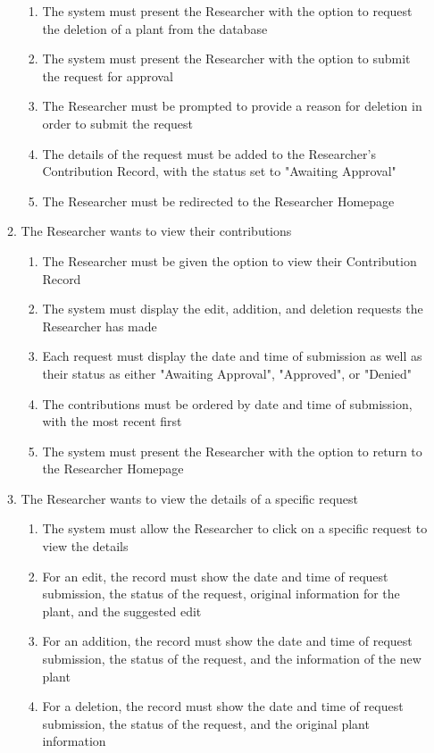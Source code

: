\documentclass[]{article}
\begin{document}
\begin{enumerate}[{VP}1.]
\begin{enumerate}[{BE2}.1]
		\begin{enumerate}
			\item The system must present the Researcher with the option to request the deletion of a plant from the database
			\item The system must present the Researcher with the option to submit the request for approval
			\item The Researcher must be prompted to provide a reason for deletion in order to submit the request
			\item {\color{red}The details of the request must be added to the Researcher's Contribution Record, with the status set to "Awaiting Approval"}
			\item {\color{red}The Researcher must be redirected to the Researcher Homepage}
		\end{enumerate}
		\item The Researcher wants to view their contributions
		\begin{enumerate}
			\item The Researcher must be given the option to view their Contribution Record
			\item The system must display the edit, addition, and deletion requests the Researcher has made
			\item Each request must display the date and time of submission as well as their status as either "Awaiting Approval", "Approved", or "Denied"
			\item The contributions must be ordered by date and time of submission, with the most recent first
			\item The system must present the Researcher with the option to return to the Researcher Homepage
		\end{enumerate}
		\item The Researcher wants to view the details of a specific request
		\begin{enumerate}
		    \item The system must allow the Researcher to click on a specific request to view the details
		    \item For an edit, the record must show the date and time of request submission, the status of the request, original information for the plant, and the suggested edit
		    \item For an addition, the record must show the date and time of request submission, the status of the request, and the information of the new plant
		    \item For a deletion, the record must show the date and time of request submission, the status of the request, and the original plant information

\end{enumerate}
\end{enumerate}
\end{enumerate}
\end{document}

